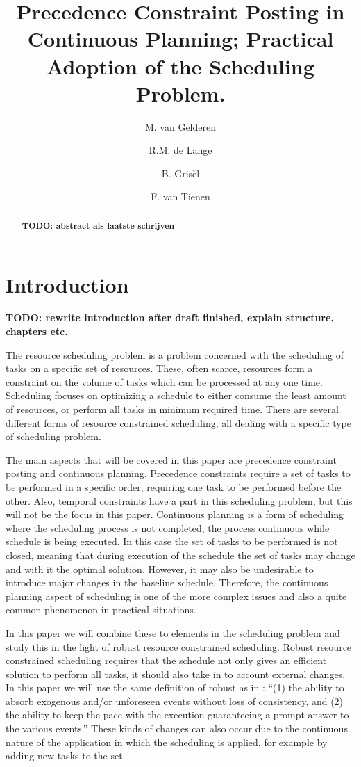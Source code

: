 \documentclass{article}
\title{Precedence Constraint Posting in Continuous Planning; Practical Adoption of the Scheduling Problem.}
\author{M. van Gelderen  \and
    R.M. de Lange \and
    B. Gris\`el \and
    F. van Tienen}
\newcommand{\TODO}[1]{{\color{red}\textbf{TODO: #1}}}
\begin{document}
\maketitle
\thispagestyle{empty}

\begin{abstract}
\TODO{abstract als laatste schrijven}
\end{abstract}

\newpage

\section{Introduction}
\TODO{rewrite introduction after draft finished, explain structure, chapters etc.}

The resource scheduling problem is a problem concerned with the scheduling of tasks on a specific set of resources.
These, often scarce, resources form a constraint on the volume of tasks which can be processed at any one time.
Scheduling focuses on optimizing a schedule to either consume the least amount of resources, or perform all tasks in minimum required time.  \cite{brucker99}
There are several different forms of resource constrained scheduling, all dealing with a specific type of scheduling problem.

The main aspects that will be covered in this paper are precedence constraint posting and continuous planning.
Precedence constraints require a set of tasks to be performed in a specific order, requiring one task to be performed before the other.
Also, temporal constraints have a part in this scheduling problem, but this will not be the focus in this paper.
Continuous planning is a form of scheduling where the scheduling process is not completed, the process continuous while schedule is being executed.
In this case the set of tasks to be performed is not closed, meaning that during execution of the schedule the set of tasks may change and with it the optimal solution.
However, it may also be undesirable to introduce major changes in the baseline schedule.
Therefore, the continuous planning aspect of scheduling is one of the more complex issues and also a quite common phenomenon in practical situations.

In this paper we will combine these to elements in the scheduling problem and study this in the light of robust resource constrained scheduling.
Robust resource constrained scheduling requires that the schedule not only gives an efficient solution to perform all tasks, it should also take in to account external changes.
In this paper we will use the same definition of robust as in \cite{policella07} : ``{(1) the ability to absorb exogenous and/or unforeseen events without loss of consistency, and (2) the ability to keep the pace with the execution guaranteeing a prompt answer to the various events.}''
These kinds of changes can also occur due to the continuous nature of the application in which the scheduling is applied, for example by adding new tasks to the set.
\end{document}
